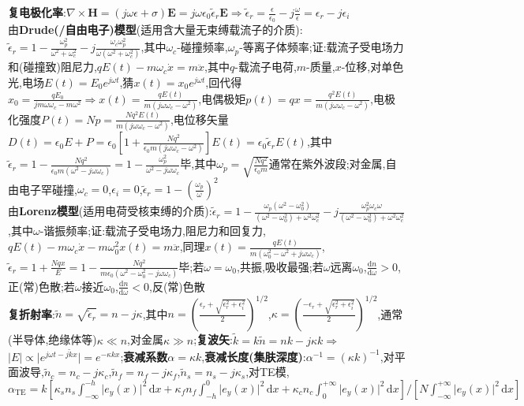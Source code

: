 \documentclass[a4paper,10pt]{article}
\providecommand{\abs}[1]{\lvert#1\rvert}
\begin{document}
\begin{multicols}{2}
\textbf{复电极化率}:$\nabla\times\bm{H}=(j\omega\epsilon+\sigma)\bm{E}=j\omega\epsilon_0\tilde{\epsilon}_r\bm{E}\Rightarrow\tilde{\epsilon}_{r}=\frac{\epsilon}{\epsilon_0}-j\frac{\omega}{\epsilon}=\epsilon_r-j\epsilon_i$\\
由\textbf{Drude(/自由电子)模型}(适用含大量无束缚载流子的介质):$\tilde{\epsilon}_r=1-\frac{\omega_p^2}{\omega^2+\omega_c^2}-j\frac{\omega_c\omega_p^2}{\omega(\omega^2+\omega_c^2)}$,其中$\omega_c$-碰撞频率,$\omega_p$-等离子体频率;证:载流子受电场力和(碰撞致)阻尼力,$qE(t)-m\omega_c\dot{x}=m\ddot{x}$,其中$q$-载流子电荷,$m$-质量,$x$-位移,对单色光,电场$E(t)=E_0e^{j\omega t}$,猜$x(t)=x_0e^{j\omega t}$,回代得$x_0=\frac{qE_0}{jm\omega\omega_c-m\omega^2}\Rightarrow x(t)=\frac{qE(t)}{m(j\omega\omega_c-\omega^2)}$,电偶极矩$p(t)=qx=\frac{q^2E(t)}{m(j\omega\omega_c-\omega^2)}$,电极化强度$P(t)=Np=\frac{Nq^2E(t)}{m(j\omega\omega_c-\omega^2)}$,电位移矢量$D(t)=\epsilon_0E+P=\epsilon_0[1+\frac{Nq^2}{\epsilon_0m(j\omega\omega_c-\omega^2)}]E(t)=\epsilon_0\tilde{\epsilon}_rE(t)$,其中$\tilde{\epsilon}_r=1-\frac{Nq^2}{\epsilon_0m(\omega^2-j\omega\omega_c)}=1-\frac{\omega_p^2}{\omega^2-j\omega\omega_c}$毕,其中$\omega_p=\sqrt{\frac{Nq^2}{\epsilon_0m}}$通常在紫外波段;对金属,自由电子罕碰撞,$\omega_c=0$,$\epsilon_i=0$,$\tilde{\epsilon}_r=1-(\frac{\omega_p}{\omega})^2$\\
由\textbf{Lorenz模型}(适用电荷受核束缚的介质):$\tilde{\epsilon}_r=1-\frac{\omega_p(\omega^2-\omega_0^2)}{(\omega^2-\omega_0^2)+\omega^2\omega_c^2}-j\frac{\omega_p^2\omega_c\omega}{(\omega^2-\omega_0^2)+\omega^2\omega_c^2}$,其中$\omega$-谐振频率;证:载流子受电场力,阻尼力和回复力,$qE(t)-m\omega_c\dot{x}-m\omega_0^2x(t)=m\ddot{x}$,同理$x(t)=\frac{qE(t)}{m(\omega_0^2-\omega^2+j\omega\omega_c)}$,$\tilde{\epsilon}_r=1+\frac{Nqx}{E}=1-\frac{Nq^2}{m\epsilon_0(\omega^2-\omega_0^2-j\omega\omega_c)}$毕;若$\omega=\omega_0$,共振,吸收最强;若$\omega$远离$\omega_0$,$\frac{\mathrm{d}n}{\mathrm{d}\omega}>0$,正(常)色散;若$\omega$接近$\omega_0$,$\frac{\mathrm{d}n}{\mathrm{d}\omega}<0$,反(常)色散\\ %
\textbf{复折射率}:$\tilde{n}=\sqrt{\tilde{\epsilon}_r}=n-j\kappa$,其中$n=(\frac{\epsilon_r+\sqrt{\epsilon_r^2+\epsilon_i^2}}{2})^{1/2}$,$\kappa=(\frac{-\epsilon_r+\sqrt{\epsilon_r^2+\epsilon_i^2}}{2})^{1/2}$,通常(半导体,绝缘体等)$\kappa\ll n$,对金属$\kappa\gg n$;\textbf{复波矢}:$\tilde{k}=k\tilde{n}=nk-j\kappa k\Rightarrow$$\abs{E}\propto\abs{e^{j\omega t-j\tilde{k}x}}=e^{-\kappa kx}$;\textbf{衰减系数}$\alpha=\kappa k$,\textbf{衰减长度(集肤深度)}:$\alpha^{-1}=(\kappa k)^{-1}$,对平面波导,$\tilde{n}_c=n_c-j\kappa_c$,$\tilde{n}_f=n_f-j\kappa_f$,$\tilde{n}_s=n_s-j\kappa_s$,对TE模,$\alpha_{\text{TE}}=k[\kappa_sn_s\int_{-\infty}^{-h}\abs{e_y(x)}^2\,\mathrm{d}x+\kappa_fn_f\int_{-h}^0\abs{e_y(x)}^2\,\mathrm{d}x+\kappa_cn_c\int_0^{+\infty}\abs{e_y(x)}^2\,\mathrm{d}x]/[N\int_{-\infty}^{+\infty}\abs{e_y(x)}^2\,\mathrm{d}x]$\\
$$
\end{multicols}
\end{document}
